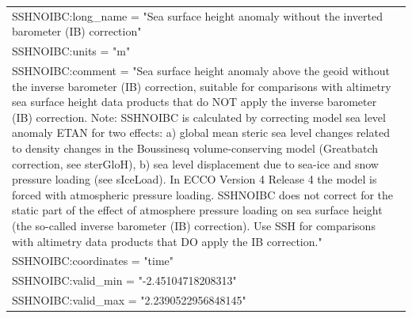 \begin{longtable}{|p{\textwidth}|}
\hspace{0.5cm}\hspace{0.5cm}SSHNOIBC:long\_name = "Sea surface height anomaly without the inverted barometer (IB) correction"\\
\hspace{0.5cm}\hspace{0.5cm}SSHNOIBC:units = "m"\\
\hspace{0.5cm}\hspace{0.5cm}SSHNOIBC:comment = "Sea surface height anomaly above the geoid without the inverse barometer (IB) correction, suitable for comparisons with altimetry sea surface height data products that do NOT apply the inverse barometer (IB) correction. Note: SSHNOIBC is calculated by correcting model sea level anomaly ETAN for two effects: a) global mean steric sea level changes related to density changes in the Boussinesq volume-conserving model (Greatbatch correction, see sterGloH), b) sea level displacement due to sea-ice and snow pressure loading (see sIceLoad). In ECCO Version 4 Release 4 the model is forced with atmospheric pressure loading. SSHNOIBC does not correct for the static part of the effect of atmosphere pressure loading on sea surface height (the so-called inverse barometer (IB) correction). Use SSH for comparisons with altimetry data products that DO apply the IB correction."\\
\hspace{0.5cm}\hspace{0.5cm}SSHNOIBC:coordinates = "time"\\
\hspace{0.5cm}\hspace{0.5cm}SSHNOIBC:valid\_min = "-2.45104718208313"\\
\hspace{0.5cm}\hspace{0.5cm}SSHNOIBC:valid\_max = "2.2390522956848145"\\
\hline
\end{longtable}
